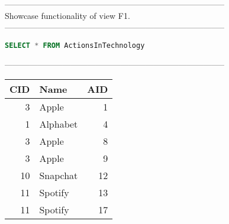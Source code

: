 --------------------------------------------------------------------------------
\\Showcase functionality of view F1.\\
--------------------------------------------------------------------------------
\begin{lstlisting}[language = SQL]
SELECT * FROM ActionsInTechnology
\end{lstlisting}
--------------------------------------------------------------------------------\\\begin{tabular}{rlr}
\toprule
   CID & Name     &   AID \\
\midrule
     3 & Apple    &     1 \\
     1 & Alphabet &     4 \\
     3 & Apple    &     8 \\
     3 & Apple    &     9 \\
    10 & Snapchat &    12 \\
    11 & Spotify  &    13 \\
    11 & Spotify  &    17 \\
\bottomrule
\end{tabular}